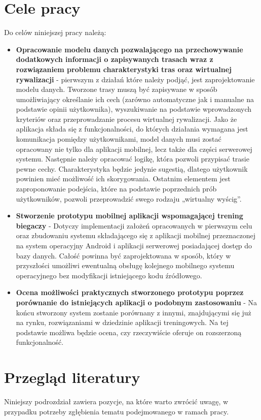 \section{Cele pracy}
Do celów niniejszej pracy należą:
\begin{itemize}
\item \textbf{Opracowanie modelu danych pozwalającego na przechowywanie dodatkowych informacji o zapisywanych trasach wraz z rozwiązaniem problemu charakterystyki tras oraz wirtualnej rywalizacji} - pierwszym z działań które należy podjąć, jest zaprojektowanie modelu danych. Tworzone trasy muszą być zapisywane w sposób umożliwiający określanie ich cech (zarówno automatyczne jak i manualne na podstawie opinii użytkownika), wyszukiwanie na podstawie wprowadzonych kryteriów oraz przeprowadzanie procesu wirtualnej rywalizacji. Jako że aplikacja składa się z funkcjonalności, do których działania wymagana jest komunikacja pomiędzy użytkownikami, model danych musi zostać opracowany nie tylko dla aplikacji mobilnej, lecz także dla części serwerowej systemu. Następnie należy opracować logikę, która pozwoli przypisać trasie pewne cechy. Charakterystyka będzie jedynie sugestią, dlatego użytkownik powinien mieć możliwość ich skorygowania. Ostatnim elementem jest zaproponowanie podejścia, które na podstawie poprzednich prób użytkowników, pozwoli przeprowadzić swego rodzaju „wirtualny wyścig”.
\item \textbf{Stworzenie prototypu mobilnej aplikacji wspomagającej trening biegaczy} - Dotyczy implementacji założeń opracowanych w pierwszym celu oraz zbudowaniu systemu składającego się z aplikacji mobilnej przeznaczonej na system operacyjny Android i aplikacji serwerowej posiadającej dostęp do bazy danych. Całość powinna być zaprojektowana w sposób, który w przyszłości umożliwi ewentualną obsługę kolejnego mobilnego systemu operacyjnego bez modyfikacji istniejącego kodu źródłowego.
\item \textbf{Ocena możliwości praktycznych stworzonego prototypu poprzez porównanie do istniejących aplikacji o podobnym zastosowaniu} - Na końcu stworzony system zostanie porównany z innymi, znajdującymi się już na rynku, rozwiązaniami w dziedzinie aplikacji treningowych. Na tej podstawie możliwa będzie ocena, czy rzeczywiście oferuje on rozszerzoną funkcjonalność.
\end{itemize}

\section{Przegląd literatury}
Niniejszy podrozdział zawiera pozycje, na które warto zwrócić uwagę, w przypadku potrzeby zgłębienia tematu podejmowanego w ramach pracy.
